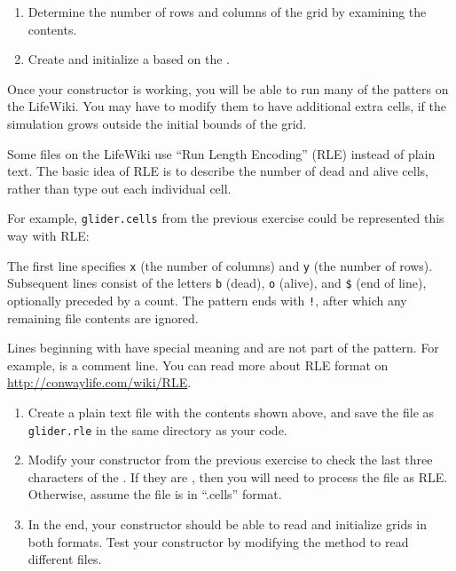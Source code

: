\begin{exercise}
\begin{enumerate}
\item Determine the number of rows and columns of the grid by examining the  contents.

\item Create and initialize a  based on the .

\end{enumerate}

Once your constructor is working, you will be able to run many of the patters on the LifeWiki.
You may have to modify them to have additional extra cells, if the simulation grows outside the initial bounds of the grid.

\end{exercise}


\begin{exercise}
Some files on the LifeWiki use ``Run Length Encoding'' (RLE) instead of plain text.
The basic idea of RLE is to describe the number of dead and alive cells, rather than type out each individual cell.

For example, \verb|glider.cells| from the previous exercise could be represented this way with RLE:


The first line specifies \verb|x| (the number of columns) and \verb|y| (the number of rows).
Subsequent lines consist of the letters \verb|b| (dead), \verb|o| (alive), and \verb|$| (end of line), optionally preceded by a count.
The pattern ends with \verb|!|, after which any remaining file contents are ignored.

Lines beginning with \java{#} have special meaning and are not part of the pattern.
For example,  is a comment line.
You can read more about RLE format on \url{http://conwaylife.com/wiki/RLE}.

\begin{enumerate}

\item Create a plain text file with the contents shown above, and save the file as \verb|glider.rle| in the same directory as your code.

\item Modify your constructor from the previous exercise to check the last three characters of the .
If they are , then you will need to process the file as RLE.
Otherwise, assume the file is in ``.cells'' format.

\item In the end, your constructor should be able to read and initialize grids in both formats.
Test your constructor by modifying the  method to read different files.

\end{enumerate}

\end{exercise}



